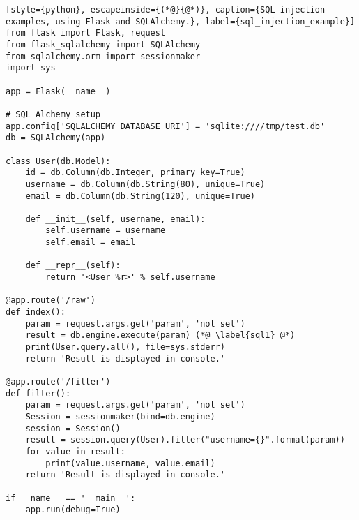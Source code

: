 \begin{lstlisting}[style={python}, escapeinside={(*@}{@*)}, caption={SQL injection examples, using Flask and SQLAlchemy.}, label={sql_injection_example}]
from flask import Flask, request
from flask_sqlalchemy import SQLAlchemy
from sqlalchemy.orm import sessionmaker
import sys

app = Flask(__name__)

# SQL Alchemy setup
app.config['SQLALCHEMY_DATABASE_URI'] = 'sqlite:////tmp/test.db'
db = SQLAlchemy(app)

class User(db.Model):
    id = db.Column(db.Integer, primary_key=True)
    username = db.Column(db.String(80), unique=True)
    email = db.Column(db.String(120), unique=True)

    def __init__(self, username, email):
        self.username = username
        self.email = email

    def __repr__(self):
        return '<User %r>' % self.username    
    
@app.route('/raw')
def index():
    param = request.args.get('param', 'not set')
    result = db.engine.execute(param) (*@ \label{sql1} @*)
    print(User.query.all(), file=sys.stderr)
    return 'Result is displayed in console.'

@app.route('/filter')
def filter():
    param = request.args.get('param', 'not set')
    Session = sessionmaker(bind=db.engine)
    session = Session()
    result = session.query(User).filter("username={}".format(param))
    for value in result:
        print(value.username, value.email)
    return 'Result is displayed in console.'

if __name__ == '__main__':
    app.run(debug=True)
\end{lstlisting}
